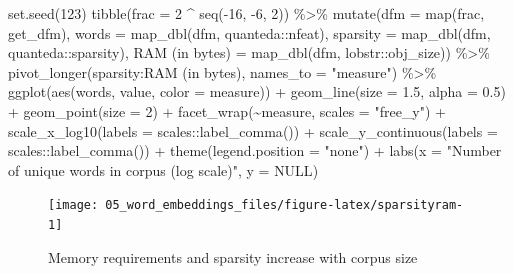 \documentclass[
]{krantz}
\makeatletter
\newenvironment{Shaded}{\begin{snugshade}}{\end{snugshade}}
\newcommand{\AttributeTok}[1]{\textcolor[rgb]{0.77,0.63,0.00}{#1}}
\newcommand{\ConstantTok}[1]{\textcolor[rgb]{0.00,0.00,0.00}{#1}}
\newcommand{\DecValTok}[1]{\textcolor[rgb]{0.00,0.00,0.81}{#1}}
\newcommand{\FloatTok}[1]{\textcolor[rgb]{0.00,0.00,0.81}{#1}}
\newcommand{\FunctionTok}[1]{\textcolor[rgb]{0.00,0.00,0.00}{#1}}
\newcommand{\NormalTok}[1]{#1}
\newcommand{\OtherTok}[1]{\textcolor[rgb]{0.56,0.35,0.01}{#1}}
\newcommand{\SpecialCharTok}[1]{\textcolor[rgb]{0.00,0.00,0.00}{#1}}
\newcommand{\StringTok}[1]{\textcolor[rgb]{0.31,0.60,0.02}{#1}}
\newenvironment{kframe}{%
\medskip{}
\setlength{\fboxsep}{.8em}
 \def\at@end@of@kframe{}%
 \ifinner\ifhmode%
  \def\at@end@of@kframe{\end{minipage}}%
  \begin{minipage}{\columnwidth}%
 \fi\fi%
 \def\FrameCommand##1{\hskip\@totalleftmargin \hskip-\fboxsep
 \colorbox{shadecolor}{##1}\hskip-\fboxsep
     \hskip-\linewidth \hskip-\@totalleftmargin \hskip\columnwidth}%
 \MakeFramed {\advance\hsize-\width
   \@totalleftmargin\z@ \linewidth\hsize
   \@setminipage}}%
 {\par\unskip\endMakeFramed%
 \at@end@of@kframe}
\renewenvironment{Shaded}{\begin{kframe}}{\end{kframe}}
\makeatother
\begin{document}
\begin{Shaded}
\begin{Highlighting}[]
\FunctionTok{set.seed}\NormalTok{(}\DecValTok{123}\NormalTok{)}
\FunctionTok{tibble}\NormalTok{(}\AttributeTok{frac =} \DecValTok{2} \SpecialCharTok{\^{}} \FunctionTok{seq}\NormalTok{(}\SpecialCharTok{{-}}\DecValTok{16}\NormalTok{, }\SpecialCharTok{{-}}\DecValTok{6}\NormalTok{, }\DecValTok{2}\NormalTok{)) }\SpecialCharTok{\%\textgreater{}\%}
  \FunctionTok{mutate}\NormalTok{(}\AttributeTok{dfm =} \FunctionTok{map}\NormalTok{(frac, get\_dfm),}
         \AttributeTok{words =} \FunctionTok{map\_dbl}\NormalTok{(dfm, quanteda}\SpecialCharTok{::}\NormalTok{nfeat),}
         \AttributeTok{sparsity =} \FunctionTok{map\_dbl}\NormalTok{(dfm, quanteda}\SpecialCharTok{::}\NormalTok{sparsity),}
         \StringTok{\textasciigrave{}}\AttributeTok{RAM (in bytes)}\StringTok{\textasciigrave{}} \OtherTok{=} \FunctionTok{map\_dbl}\NormalTok{(dfm, lobstr}\SpecialCharTok{::}\NormalTok{obj\_size)) }\SpecialCharTok{\%\textgreater{}\%}
  \FunctionTok{pivot\_longer}\NormalTok{(sparsity}\SpecialCharTok{:}\StringTok{\textasciigrave{}}\AttributeTok{RAM (in bytes)}\StringTok{\textasciigrave{}}\NormalTok{, }\AttributeTok{names\_to =} \StringTok{"measure"}\NormalTok{) }\SpecialCharTok{\%\textgreater{}\%}
  \FunctionTok{ggplot}\NormalTok{(}\FunctionTok{aes}\NormalTok{(words, value, }\AttributeTok{color =}\NormalTok{ measure)) }\SpecialCharTok{+}
  \FunctionTok{geom\_line}\NormalTok{(}\AttributeTok{size =} \FloatTok{1.5}\NormalTok{, }\AttributeTok{alpha =} \FloatTok{0.5}\NormalTok{) }\SpecialCharTok{+}
  \FunctionTok{geom\_point}\NormalTok{(}\AttributeTok{size =} \DecValTok{2}\NormalTok{) }\SpecialCharTok{+}
  \FunctionTok{facet\_wrap}\NormalTok{(}\SpecialCharTok{\textasciitilde{}}\NormalTok{measure, }\AttributeTok{scales =} \StringTok{"free\_y"}\NormalTok{) }\SpecialCharTok{+}
  \FunctionTok{scale\_x\_log10}\NormalTok{(}\AttributeTok{labels =}\NormalTok{ scales}\SpecialCharTok{::}\FunctionTok{label\_comma}\NormalTok{()) }\SpecialCharTok{+}
  \FunctionTok{scale\_y\_continuous}\NormalTok{(}\AttributeTok{labels =}\NormalTok{ scales}\SpecialCharTok{::}\FunctionTok{label\_comma}\NormalTok{()) }\SpecialCharTok{+}
  \FunctionTok{theme}\NormalTok{(}\AttributeTok{legend.position =} \StringTok{"none"}\NormalTok{) }\SpecialCharTok{+}
  \FunctionTok{labs}\NormalTok{(}\AttributeTok{x =} \StringTok{"Number of unique words in corpus (log scale)"}\NormalTok{,}
       \AttributeTok{y =} \ConstantTok{NULL}\NormalTok{)}
\end{Highlighting}
\end{Shaded}

\begin{figure}

{\centering \texttt{[image: 05\_word\_embeddings\_files/figure-latex/sparsityram-1]} 

}

\caption{Memory requirements and sparsity increase with corpus size}\label{fig:sparsityram}
\end{figure}
\end{document}
